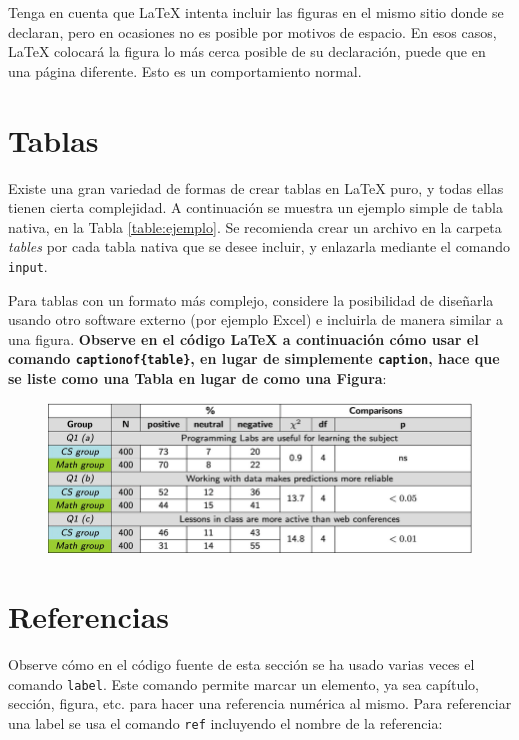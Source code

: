 Tenga en cuenta que LaTeX intenta incluir las figuras en el mismo sitio donde se declaran, pero en ocasiones no es posible por motivos de espacio. En esos casos, LaTeX colocará la figura lo más cerca posible de su declaración, puede que en una página diferente. Esto es un comportamiento normal.

\section{Tablas}
Existe una gran variedad de formas de crear tablas en LaTeX puro, y todas ellas tienen cierta complejidad. A continuación se muestra un ejemplo simple de tabla nativa, en la Tabla \ref{table:ejemplo}. Se recomienda crear un archivo en la carpeta \textit{tables} por cada tabla nativa que se desee incluir, y enlazarla mediante el comando \texttt{input}.



Para tablas con un formato más complejo, considere la posibilidad de diseñarla usando otro software externo (por ejemplo Excel) e incluirla de manera similar a una figura. \textbf{Observe en el código LaTeX a continuación cómo usar el comando \texttt{captionof\{table\}}, en lugar de simplemente \texttt{caption}, hace que se liste como una Tabla en lugar de como una Figura}:

\begin{figure}[htp]
    \centering
    \includegraphics[width=1.0\textwidth]{tables/complex_table.png}
    \label{table:ejemplo2}
\end{figure}

\section{Referencias}
Observe cómo en el código fuente de esta sección se ha usado varias veces el comando \texttt{label}. Este comando permite marcar un elemento, ya sea capítulo, sección, figura, etc. para hacer una referencia numérica al mismo. Para referenciar una label se usa el comando \texttt{ref} incluyendo el nombre de la referencia:

